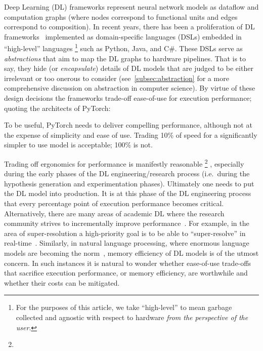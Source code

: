 Deep Learning (DL) frameworks represent neural network models as dataflow and computation graphs (where nodes correspond to functional units and edges correspond to composition).
In recent years, there has been a proliferation of DL frameworks~\cite{paszke2019pytorch,abadi2016tensorflow,chen2015mxnet,cntk} implemented as domain-specific languages (DSLs) embedded in ``high-level'' languages%
\footnote{For the purposes of this article, we take ``high-level'' to mean garbage collected and agnostic with respect to hardware \textit{from the perspective of the user}.} such as Python, Java, and C\#.
These DSLs serve as \textit{abstractions} that aim to map the DL graphs to hardware pipelines.
That is to say, they hide (or \textit{encapsulate}) details of DL models that are judged to be either irrelevant or too onerous to consider (see~\cref{subsec:abstraction} for a more comprehensive discussion on abstraction in computer science).
By virtue of these design decisions the frameworks trade-off ease-of-use for execution performance;
quoting the architects of PyTorch:
\begin{displayquote}
  To be useful, PyTorch needs to deliver compelling performance, although not at the expense of simplicity and ease of use.
  Trading 10\% of speed for a significantly simpler to use model is acceptable; 100\% is not.
\end{displayquote}

Trading off ergonomics for performance is manifestly reasonable%
\footnote{}%
, especially during the early phases of the DL engineering/research process (i.e.\ during the hypothesis generation and experimentation phases).
Ultimately one needs to put the DL model into production.
It is at this phase of the DL engineering process that every percentage point of execution performance becomes critical.
Alternatively, there are many areas of academic DL where the research community strives to incrementally improve performance~\cite{abdelhamed2020ntire,hall2020probability,ILSVRC15}.
For example, in the area of super-resolution a high-priority goal is to be able to ``super-resolve'' in real-time~\cite{7780576}.
Similarly, in natural language processing, where enormous language models are becoming the norm~\cite{brown2020language}, memory efficiency of DL models is of the utmost concern.
In such instances it is natural to wonder whether ease-of-use trade-offs that sacrifice execution performance, or memory efficiency, are worthwhile and whether their costs can be mitigated.

